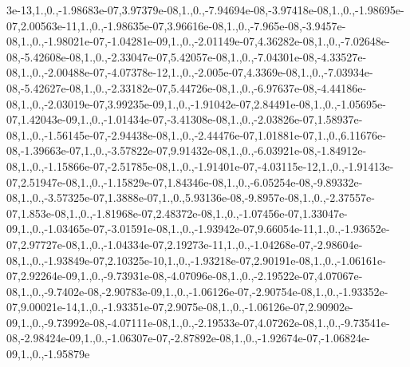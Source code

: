 {3e-\/13,1.,0.,-\/1.\-98683e-\/07,3.\-97379e-\/08,1.,0.,-\/7.\-94694e-\/08,-\/3.\-97418e-\/08,1.,0.,-\/1.\-98695e-\/07,2.\-00563e-\/11,1.,0.,-\/1.\-98635e-\/07,3.\-96616e-\/08,1.,0.,-\/7.\-965e-\/08,-\/3.\-9457e-\/08,1.,0.,-\/1.\-98021e-\/07,-\/1.\-04281e-\/09,1.,0.,-\/2.\-01149e-\/07,4.\-36282e-\/08,1.,0.,-\/7.\-02648e-\/08,-\/5.\-42608e-\/08,1.,0.,-\/2.\-33047e-\/07,5.\-42057e-\/08,1.,0.,-\/7.\-04301e-\/08,-\/4.\-33527e-\/08,1.,0.,-\/2.\-00488e-\/07,-\/4.\-07378e-\/12,1.,0.,-\/2.\-005e-\/07,4.\-3369e-\/08,1.,0.,-\/7.\-03934e-\/08,-\/5.\-42627e-\/08,1.,0.,-\/2.\-33182e-\/07,5.\-44726e-\/08,1.,0.,-\/6.\-97637e-\/08,-\/4.\-44186e-\/08,1.,0.,-\/2.\-03019e-\/07,3.\-99235e-\/09,1.,0.,-\/1.\-91042e-\/07,2.\-84491e-\/08,1.,0.,-\/1.\-05695e-\/07,1.\-42043e-\/09,1.,0.,-\/1.\-01434e-\/07,-\/3.\-41308e-\/08,1.,0.,-\/2.\-03826e-\/07,1.\-58937e-\/08,1.,0.,-\/1.\-56145e-\/07,-\/2.\-94438e-\/08,1.,0.,-\/2.\-44476e-\/07,1.\-01881e-\/07,1.,0.,6.\-11676e-\/08,-\/1.\-39663e-\/07,1.,0.,-\/3.\-57822e-\/07,9.\-91432e-\/08,1.,0.,-\/6.\-03921e-\/08,-\/1.\-84912e-\/08,1.,0.,-\/1.\-15866e-\/07,-\/2.\-51785e-\/08,1.,0.,-\/1.\-91401e-\/07,-\/4.\-03115e-\/12,1.,0.,-\/1.\-91413e-\/07,2.\-51947e-\/08,1.,0.,-\/1.\-15829e-\/07,1.\-84346e-\/08,1.,0.,-\/6.\-05254e-\/08,-\/9.\-89332e-\/08,1.,0.,-\/3.\-57325e-\/07,1.\-3888e-\/07,1.,0.,5.\-93136e-\/08,-\/9.\-8957e-\/08,1.,0.,-\/2.\-37557e-\/07,1.\-853e-\/08,1.,0.,-\/1.\-81968e-\/07,2.\-48372e-\/08,1.,0.,-\/1.\-07456e-\/07,1.\-33047e-\/09,1.,0.,-\/1.\-03465e-\/07,-\/3.\-01591e-\/08,1.,0.,-\/1.\-93942e-\/07,9.\-66054e-\/11,1.,0.,-\/1.\-93652e-\/07,2.\-97727e-\/08,1.,0.,-\/1.\-04334e-\/07,2.\-19273e-\/11,1.,0.,-\/1.\-04268e-\/07,-\/2.\-98604e-\/08,1.,0.,-\/1.\-93849e-\/07,2.\-10325e-\/10,1.,0.,-\/1.\-93218e-\/07,2.\-90191e-\/08,1.,0.,-\/1.\-06161e-\/07,2.\-92264e-\/09,1.,0.,-\/9.\-73931e-\/08,-\/4.\-07096e-\/08,1.,0.,-\/2.\-19522e-\/07,4.\-07067e-\/08,1.,0.,-\/9.\-7402e-\/08,-\/2.\-90783e-\/09,1.,0.,-\/1.\-06126e-\/07,-\/2.\-90754e-\/08,1.,0.,-\/1.\-93352e-\/07,9.\-00021e-\/14,1.,0.,-\/1.\-93351e-\/07,2.\-9075e-\/08,1.,0.,-\/1.\-06126e-\/07,2.\-90902e-\/09,1.,0.,-\/9.\-73992e-\/08,-\/4.\-07111e-\/08,1.,0.,-\/2.\-19533e-\/07,4.\-07262e-\/08,1.,0.,-\/9.\-73541e-\/08,-\/2.\-98424e-\/09,1.,0.,-\/1.\-06307e-\/07,-\/2.\-87892e-\/08,1.,0.,-\/1.\-92674e-\/07,-\/1.\-06824e-\/09,1.,0.,-\/1.\-95879e}
